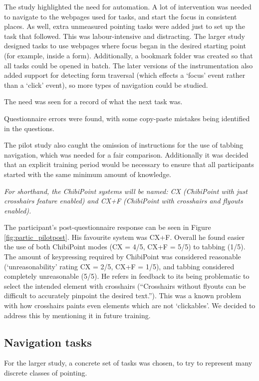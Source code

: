 \documentclass[a4paper, 12pt]{report}
\begin{document}
The study highlighted the need for automation. A lot of intervention was needed to navigate to the webpages used for tasks, and start the focus in consistent places. As well, extra unmeasured pointing tasks were added just to set up the task that followed. This was labour-intensive and distracting. The larger study designed tasks to use webpages where focus began in the desired starting point (for example, inside a form). Additionally, a bookmark folder was created so that all tasks could be opened in batch. The later versions of the instrumentation also added support for detecting form traversal (which effects a `focus' event rather than a `click' event), so more types of navigation could be studied.

The need was seen for a record of what the next task was.

Questionnaire errors were found, with some copy-paste mistakes being identified in the questions.

The pilot study also caught the omission of instructions for the use of tabbing navigation, which was needed for a fair comparison. Additionally it was decided that an explicit training period would be necessary to ensure that all participants started with the same minimum amount of knowledge.

\textit{For shorthand, the ChibiPoint systems will be named: CX (ChibiPoint with just crosshairs feature enabled) and CX+F (ChibiPoint with crosshairs and flyouts enabled).}

The participant's post-questionnaire response can be seen in Figure \ref{fig:partic_pilotpost}. His favourite system was CX+F. Overall he found easier the use of both ChibiPoint modes (CX = 4/5, CX+F = 5/5) to tabbing (1/5). The amount of keypressing required by ChibiPoint was considered reasonable (`unreasonability' rating CX = 2/5, CX+F = 1/5), and tabbing considered completely unreasonable (5/5). He refers in feedback to its being problematic to select the intended element with crosshairs (``Crosshairs without flyouts can be difficult to accurately pinpoint the desired text.''). This was a known problem with how crosshairs paints even elements which are not `clickables'. We decided to address this by mentioning it in future training.

\subsection{Navigation tasks}
For the larger study, a concrete set of tasks was chosen, to try to represent many discrete classes of pointing.
\end{document}
